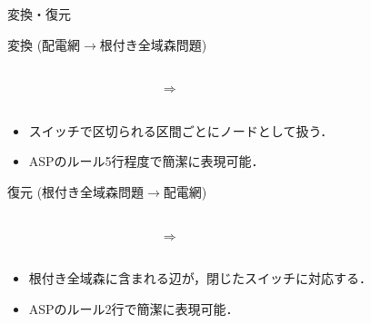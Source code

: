 \documentclass[dvipdfmx,11pt]{beamer}
\begin{document}
\begin{frame}{変換・復元}
\begin{exampleblock}{変換 (配電網$\rightarrow$根付き全域森問題)}
  \begin{columns}
    \begin{column}{0.5\textwidth}\centering
	\centering
	
    \end{column}
    \begin{column}{0.05\textwidth}\centering
      $\Rightarrow$
    \end{column}
    \begin{column}{0.5\textwidth}\centering
     \centering
     
    \end{column}
  \end{columns}
 \vskip 5pt
 \begin{itemize}\small
  \item スイッチで区切られる区間ごとにノードとして扱う．
  \item ASPのルール5行程度で簡潔に表現可能．
 \end{itemize}
\end{exampleblock}
\vfill
\begin{exampleblock}{復元 (根付き全域森問題$\rightarrow$配電網)}
  \begin{columns}
    \begin{column}{0.5\textwidth}\centering
	\centering
	
    \end{column}
    \begin{column}{0.05\textwidth}\centering
      $\Rightarrow$
    \end{column}
    \begin{column}{0.5\textwidth}\centering
     \centering
     
    \end{column}
  \end{columns}
 \vskip 5pt
 \begin{itemize}\small
  \item 根付き全域森に含まれる辺が，閉じたスイッチに対応する．
  \item ASPのルール2行で簡潔に表現可能．
 \end{itemize}
\end{exampleblock}
\vfill
\end{frame}
\end{document}

